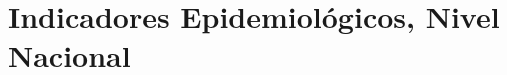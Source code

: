 \documentclass[xcolor=table]{beamer}
\begin{document}
	\section{Indicadores Epidemiológicos, Nivel Nacional}
	
%
\end{document}
